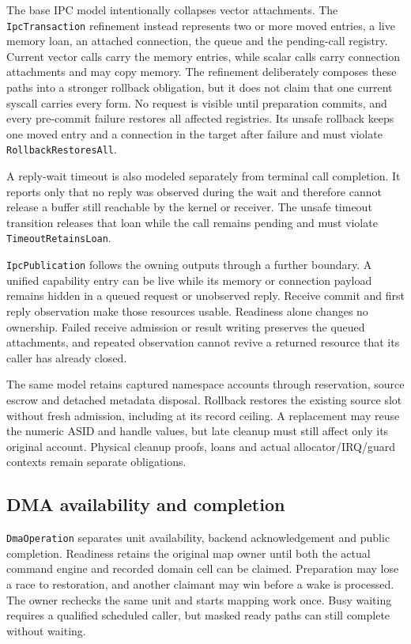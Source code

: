The base IPC model intentionally collapses vector attachments. The
\texttt{IpcTransaction} refinement instead represents two or more
moved entries, a live memory loan, an attached connection, the queue and the
pending-call registry. Current vector calls carry the memory entries, while
scalar calls carry connection attachments and may copy memory. The refinement
deliberately composes these paths into a stronger rollback obligation, but it does
not claim that one current syscall carries every form. No request is visible
until preparation commits, and every pre-commit failure restores all affected
registries. Its unsafe rollback keeps one moved entry and a connection in the
target after failure and must violate \texttt{RollbackRestoresAll}.

A reply-wait timeout is also modeled separately from terminal call completion.
It reports only that no reply was observed during the wait and therefore cannot
release a buffer still reachable by the kernel or receiver. The unsafe timeout
transition releases that loan while the call remains pending and must violate
\texttt{TimeoutRetainsLoan}.

\texttt{IpcPublication} follows the owning outputs through a
further boundary. A unified capability entry can be live while its memory or
connection payload remains hidden in a queued request or unobserved reply.
Receive commit and first reply observation make those resources usable.
Readiness alone changes no ownership. Failed receive admission or result
writing preserves the queued attachments, and repeated observation cannot
revive a returned resource that its caller has already closed.

The same model retains captured namespace accounts through reservation,
source escrow and detached metadata disposal. Rollback restores the existing
source slot without fresh admission, including at its record ceiling. A
replacement may reuse the numeric ASID and handle values, but late cleanup must
still affect only its original account. Physical cleanup proofs, loans and
actual allocator/IRQ/guard contexts remain separate obligations.

\subsection{DMA availability and completion}

\texttt{DmaOperation} separates unit availability, backend
acknowledgement and public completion. Readiness retains the original map
owner until both the actual command engine and recorded domain cell can be
claimed. Preparation may lose a race to restoration, and another claimant may
win before a wake is processed. The owner rechecks the same unit and starts
mapping work once. Busy waiting requires a qualified scheduled caller, but
masked ready paths can still complete without waiting.

